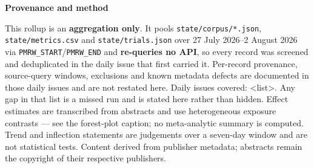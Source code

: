 \documentclass[10pt]{article}
\providecommand{\PERIODSTART}{27 July 2026}
\providecommand{\PERIODEND}{2 August 2026}
\begin{document}
\vspace{4mm}
\begin{keybox}
{\sffamily\bfseries\footnotesize\color{Deep}Provenance and method}\\[1.2mm]
{\fontsize{7.2}{8.8}\selectfont
This rollup is an \textbf{aggregation only}. It pools \texttt{state/corpus/*.json},
\texttt{state/metrics.csv} and \texttt{state/trials.json} over
\PERIODSTART{}--\PERIODEND{} via \texttt{PMRW\_START}/\texttt{PMRW\_END} and
\textbf{re-queries no API}, so every record was screened and deduplicated in the daily
issue that first carried it. Per-record provenance, source-query windows, exclusions and
known metadata defects are documented in those daily issues and are not restated here.
Daily issues covered: <list>. Any gap in that list is a missed run and is stated here
rather than hidden. Effect estimates are transcribed from abstracts and use heterogeneous
exposure contrasts --- see the forest-plot caption; no meta-analytic summary is computed.
Trend and inflection statements are judgements over a seven-day window and are not
statistical tests. Content derived from publisher metadata; abstracts remain the
copyright of their respective publishers.\par}
\end{keybox}
\end{document}
